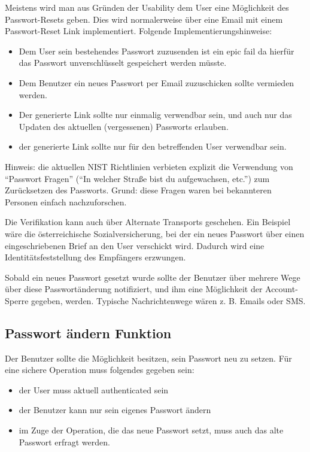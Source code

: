 Meistens wird man aus Gründen der Usability dem User eine Möglichkeit des Passwort-Resets geben. Dies wird normalerweise über eine Email mit einem Passwort-Reset Link implementiert. Folgende Implementierungshinweise:

\begin{itemize}
	\item Dem User sein bestehendes Passwort zuzusenden ist ein epic fail da hierfür das Passwort unverschlüsselt gespeichert werden müsste.
	\item Dem Benutzer ein neues Passwort per Email zuzuschicken sollte vermieden werden.
	\item Der generierte Link sollte nur einmalig verwendbar sein, und auch nur das Updaten des aktuellen (vergessenen) Passworts erlauben.
	\item der generierte Link sollte nur für den betreffenden User verwendbar sein.
\end{itemize}

Hinweis: die aktuellen NIST Richtlinien verbieten explizit die Verwendung von ``Passwort Fragen'' (``In welcher Straße bist du aufgewachsen, etc.'') zum Zurücksetzen des Passworts. Grund: diese Fragen waren bei bekannteren Personen einfach nachzuforschen.

Die Verifikation kann auch über Alternate Transports geschehen. Ein Beispiel wäre die österreichische Sozialversicherung, bei der ein neues Passwort über einen eingeschriebenen Brief an den User verschickt wird. Dadurch wird eine Identitätsfeststellung des Empfängers erzwungen.

Sobald ein neues Passwort gesetzt wurde sollte der Benutzer über mehrere Wege über diese Passwortänderung notifiziert, und ihm eine Möglichkeit der Account-Sperre gegeben, werden. Typische Nachrichtenwege wären z. B. Emails oder SMS.

\subsection{Passwort ändern Funktion}

Der Benutzer sollte die Möglichkeit besitzen, sein Passwort neu zu setzen. Für eine sichere Operation muss folgendes gegeben sein:

\begin{itemize}
	\item der User muss aktuell authenticated sein
	\item der Benutzer kann nur sein eigenes Passwort ändern
	\item im Zuge der Operation, die das neue Passwort setzt, muss auch das alte Passwort erfragt werden.
\end{itemize}

